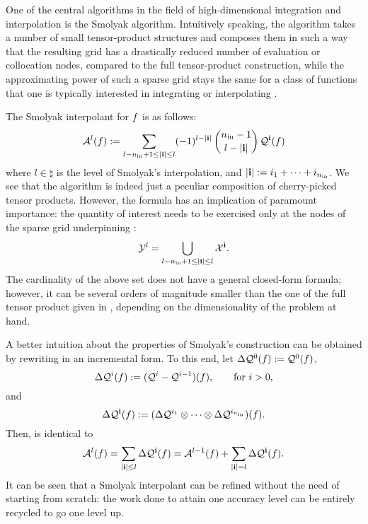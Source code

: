 One of the central algorithms in the field of high-dimensional integration and
interpolation is the Smolyak algorithm. Intuitively speaking, the algorithm
takes a number of small tensor-product structures and composes them in such a
way that the resulting grid has a drastically reduced number of evaluation or
collocation nodes, compared to the full tensor-product construction, while the
approximating power of such a sparse grid stays the same for a class of
functions that one is typically interested in integrating or interpolating
\cite{klimke2006}.

The Smolyak interpolant for $f$ is as follows:
\begin{equation} \elab{smolyak}
  \smolyak{l}(\f) := \sum_{l - \nin + 1 \leq |\vi| \leq l} (-1)^{l - |\vi|} \, {\nin - 1 \choose l - |\vi|} \, \tensor{\vi}(\f)
\end{equation}
where $l \in \natural$ is the level of Smolyak's interpolation, and $|\mathbf{i}| :=
i_1 + \dots + i_{n_\text{in}}$. We see that the algorithm is indeed just a peculiar
composition of cherry-picked tensor products. However, the formula has an
implication of paramount importance: the quantity of interest needs to be
exercised only at the nodes of the sparse grid underpinning :
\begin{equation} \elab{smolyak-grid}
  \Y^l = \bigcup_{l - \nin + 1 \leq |\vi| \leq l} \X^\vi.
\end{equation}
The cardinality of the above set does not have a general closed-form formula;
however, it can be several orders of magnitude smaller than the one of the full
tensor product given in , depending on the
dimensionality of the problem at hand.

A better intuition about the properties of Smolyak's construction can be
obtained by rewriting  in an incremental form. To this end, let
$\Delta\mathcal{Q}^{0}(f) := \mathcal{Q}^{0}(f)$,
\begin{equation} \elab{tensor-delta-1d}
  \Delta\tensor{i}(\f) := (\tensor{i} - \tensor{i - 1})(\f), \qquad \text{for $i > 0$},
\end{equation}
and
\begin{equation} \elab{tensor-delta}
  \Delta\tensor{\vi}(\f) := (\Delta\tensor{i_1} \otimes \cdots \otimes \Delta\tensor{i_\nin})(\f).
\end{equation}
Then,  is identical to
\begin{equation} \elab{smolyak-incremental}
  \smolyak{l}(\f) = \sum_{|\vi| \leq l} \Delta\tensor{\vi}(\f) = \smolyak{l - 1}(\f) + \sum_{|\vi| = l} \Delta\tensor{\vi}(\f).
\end{equation}
It can be seen that a Smolyak interpolant can be refined without the need of
starting from scratch: the work done to attain one accuracy level can be
entirely recycled to go one level up.

